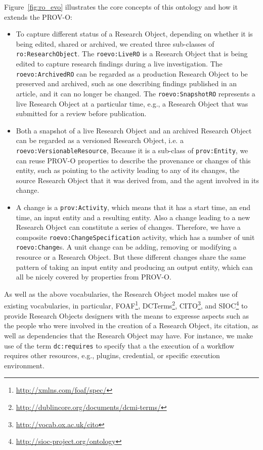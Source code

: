 Figure~\ref{fig:ro_evo} illustrates the core concepts of this ontology and how it extends the PROV-O:
\begin{itemize}
\item To capture different status of a Research Object, depending on whether it is being edited, shared or archived, we created three sub-classes of \texttt{ro:ResearchObject}. The \texttt{roevo:LiveRO} is a Research Object that is being edited to capture research findings during a live investigation. The \texttt{roevo:ArchivedRO} can be regarded as a production Research Object to be preserved and archived, such as one describing findings published in an article, and it can no longer be changed. The \texttt{roevo:SnapshotRO} represents a live Research Object at a particular time, e.g., a Research Object that was submitted for a review before publication.
\item Both a snapshot of a live Research Object and an archived Research Object can be regarded as a versioned Research Object, i.e. a \texttt{roevo:VersionableResource}, Because it is a sub-class of \texttt{prov:Entity}, we can reuse PROV-O properties to describe the provenance or changes of this entity, such as pointing to the activity leading to any of its changes, the source Research Object that it was derived from, and the agent involved in its change.
\item A change is a \texttt{prov:Activity}, which means that it has a start time, an end time, an input entity and a resulting entity. Also a change leading to a new Research Object can constitute a series of changes. Therefore, we have a composite \texttt{roevo:ChangeSpecification} activity, which has a number of unit \texttt{roevo:Change}s. A unit change can be adding, removing or modifying a resource or a Research Object. But these different changes share the same pattern of taking an input entity and producing an output entity, which can all be nicely covered by properties from PROV-O.
\end{itemize}

As well as the above vocabularies, the Research Object model makes use of existing vocabularies, in particular, FOAF\footnote{\url{http://xmlns.com/foaf/spec/}}, DCTerms\footnote{\url{http://dublincore.org/documents/dcmi-terms/}}, CITO\footnote{\url{http://vocab.ox.ac.uk/cito}}, and SIOC\footnote{\url{http://sioc-project.org/ontology}} to provide Research Objects designers with the means to expresse aspects such as the people who were involved in the creation of a Research Object, its citation, as well as dependencies that the Research Object may have. For instance, we make use of the term \texttt{dc:requires} to specify that a the execution of a workflow requires other resources, e.g., plugins, credential, or specific execution environment.

